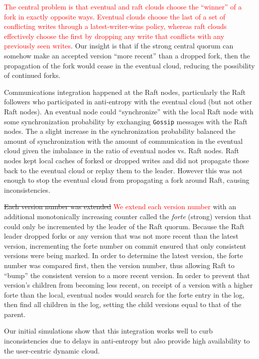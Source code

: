 \documentclass{article}
\newcommand{\pete}[1]{\textcolor{red}{#1}}
\newcommand{\change}[2]{\sout{#1} \textcolor{red}{#2}}
\begin{document}
\pete{The central problem is that eventual and raft clouds choose the ``winner'' of a fork in exactly opposite ways. Eventual clouds choose the last of a set of conflicting writes through a latest-writer-wins policy, whereas raft clouds effectively choose the first by dropping any write that conflicts with any previously seen writes}. Our insight is that if the strong central quorum can somehow make an accepted version ``more recent'' than a dropped fork, then the propagation of the fork would cease in the eventual cloud, reducing the possibility of continued forks.

Communications integration happened at the Raft nodes, particularly the Raft followers who participated in anti-entropy with the eventual cloud (but not other Raft nodes). An eventual node could ``synchronize'' with the local Raft node with some synchronization probability by exchanging \texttt{Gossip} messages with the Raft nodes. The a slight increase in the synchronization probability balanced the amount of synchronization with the amount of communication in the eventual cloud given the imbalance in the ratio of eventual nodes vs. Raft nodes. Raft nodes kept local caches of forked or dropped writes and did not propagate those back to the eventual cloud or replay them to the leader. However this was not enough to stop the eventual cloud from propagating a fork around Raft, causing inconsistencies.

\change{Each version number was extended}{We extend each version number} with an additional monotonically increasing counter called the \textit{forte} (strong) version that could only be incremented by the leader of the Raft quorum. Because the Raft leader dropped forks or any version that was not more recent than the latest version, incrementing the forte number on commit ensured that only consistent versions were being marked. In order to determine the latest version, the forte number was compared first, then the version number, thus allowing Raft to ``bump'' the consistent version to a more recent version. In order to prevent that version's children from becoming less recent, on receipt of a version with a higher forte than the local, eventual nodes would search for the forte entry in the log, then find all children in the log, setting the child versions equal to that of the parent.

Our initial simulations show that this integration works well to curb inconsistencies due to delays in anti-entropy but also provide high availability to the user-centric dynamic cloud.
\end{document}
